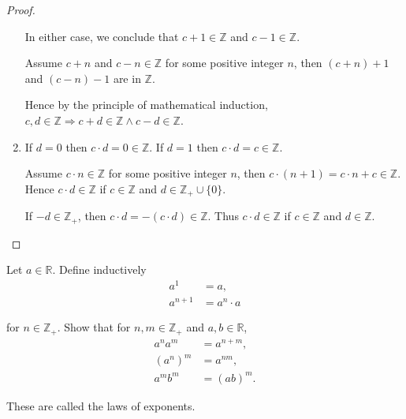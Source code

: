 \begin{proof}
\begin{enumerate}[label={(\alph*)}]
              In either case, we conclude that $c + 1\in\mathbb{Z}$ and $c - 1\in\mathbb{Z}$.

              Assume $c + n$ and $c - n\in\mathbb{Z}$ for some positive integer $n$, then $(c + n) + 1$ and $(c - n) - 1$ are in $\mathbb{Z}$.

              Hence by the principle of mathematical induction, $c, d\in\mathbb{Z}\Rightarrow c + d\in\mathbb{Z}\land c - d\in\mathbb{Z}$.
        \item If $d = 0$ then $c\cdot d = 0\in\mathbb{Z}$. If $d = 1$ then $c\cdot d = c\in\mathbb{Z}$.

              Assume $c\cdot n\in\mathbb{Z}$ for some positive integer $n$, then $c\cdot (n + 1) = c\cdot n + c\in\mathbb{Z}$. Hence $c\cdot d\in\mathbb{Z}$ if $c\in\mathbb{Z}$ and $d\in\mathbb{Z}_{+}\cup\{ 0 \}$.

              If $-d\in\mathbb{Z}_{+}$, then $c\cdot d = -(c\cdot d)\in\mathbb{Z}$. Thus $c\cdot d\in\mathbb{Z}$ if $c\in\mathbb{Z}$ and $d\in\mathbb{Z}$.
    \end{enumerate}
\end{proof}

\begin{exercise}\label{chapter1:section4:exercise6}
    Let $a\in\mathbb{R}$. Define inductively
    \begin{align*}
        a^{1}   & = a,           \\
        a^{n+1} & = a^{n}\cdot a
    \end{align*}

    for $n\in\mathbb{Z}_{+}$. Show that for $n, m\in\mathbb{Z}_{+}$ and $a, b\in\mathbb{R}$,
    \begin{align*}
        a^{n}a^{m}    & = a^{n+m},    \\
        {(a^{n})}^{m} & = a^{nm},     \\
        a^{m}b^{m}    & = {(ab)}^{m}.
    \end{align*}

    These are called the laws of exponents.
\end{exercise}

